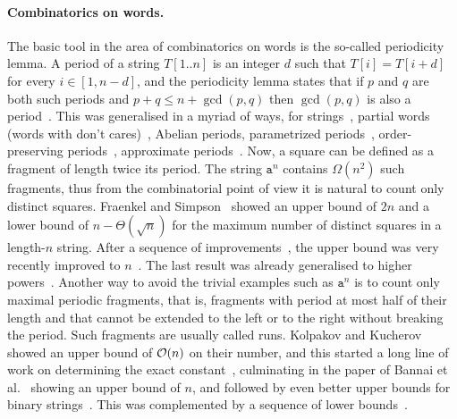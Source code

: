 \paragraph{Combinatorics on words.} The basic tool in the area of combinatorics on words is the so-called
periodicity lemma. A period of a string $T[1..n]$ is an integer $d$ such that $T[i]=T[i+d]$ for every $i\in [1,n-d]$,
and the periodicity lemma states that if $p$ and $q$ are both such periods and $p+q\leq n+\gcd(p,q)$ then 
$\gcd(p,q)$ is also a period~\cite{Fine1965}. 
This was generalised in a myriad of ways, for strings~\cite{Castelli1999,Justin2000,Tijdeman2003},
partial words (words with don't cares)~\cite{Berstel1999,Blanchet-Sadri2008,Blanchet-Sadri2002,Shur2004,Shur2001,Idiatulina2014,Kociumaka2022},
Abelian periods\cite{Constantinescu2006,Blanchet-Sadri2013}, parametrized periods~\cite{Apostolico2008},
order-preserving periods~\cite{Matsuoka2016,GOURDEL2020104463}, approximate periods~\cite{AmirICALP2010,Amir2012,AMIR2015215}.
Now, a square can be defined as a fragment of length twice its period. 
The string $\texttt{a}^{n}$ contains $\Omega(n^{2})$ such fragments,
thus from the combinatorial point of view it is natural to count only distinct squares.
Fraenkel and Simpson~\cite{Fraenkel1998} showed an upper bound of $2n$ and a lower bound of $n-\Theta(\sqrt{n})$ for the maximum number of distinct squares in a length-$n$ string.
After a sequence of improvements~\cite{Ilie2007,Deza2015,Thierry2020}, the upper bound was very recently improved to $n$~\cite{Brlek2022}.
The last result was already generalised to higher powers~\cite{Li2022}.
Another way to avoid the trivial examples such as $\texttt{a}^{n}$ is to count only maximal periodic fragments,
that is, fragments with period at most half of their length and that cannot be extended to the left or to the right without
breaking the period. Such fragments are usually called runs. Kolpakov and Kucherov~\cite{Kolpakov1999} showed
an upper bound of $\mathcal{O}(n)$ on their number, and this started a long line of work on determining the exact
constant~\cite{Rytter2006,Puglisi2008,Crochemore2008,Giraud2008,Giraud2009,Crochemore2011}, culminating
in the paper of Bannai et al.~\cite{Bannai2017} showing an upper bound of $n$, and followed by even better upper bounds
for binary strings~\cite{Fischer2015,Holub2017}. This was complemented by a sequence of 
lower bounds~\cite{Franek2008,Matsubara2008,Matsubara2009,Simpson2010}.

